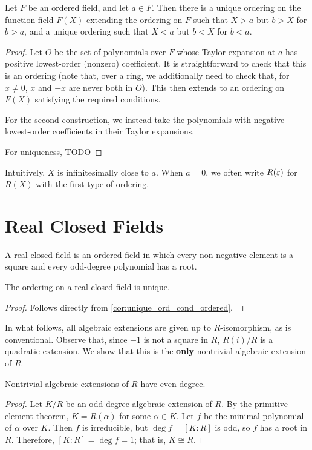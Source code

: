 \begin{lemma}
  \label{lem:order_fun_field}
  Let $F$ be an ordered field, and let $a\in F$. Then there is a unique ordering on the function field $F(X)$ extending the ordering on $F$ such that $X>a$ but $b>X$ for $b>a$, and a unique ordering such that $X<a$ but $b<X$ for $b<a$.
\end{lemma}
\begin{proof}
  Let $O$ be the set of polynomials over $F$ whose Taylor expansion at $a$ has positive lowest-order (nonzero) coefficient. It is straightforward to check that this is an ordering (note that, over a ring, we additionally need to check that, for $x\neq0$, $x$ and $-x$ are never both in $O$). This then extends to an ordering on $F(X)$ satisfying the required conditions.

  For the second construction, we instead take the polynomials with negative lowest-order coefficients in their Taylor expansions.

  For uniqueness, TODO
\end{proof}

Intuitively, $X$ is infinitesimally close to $a$. When $a=0$, we often write $R(\varepsilon)$ for $R(X)$ with the first type of ordering.

\section{Real Closed Fields}

\begin{definition}
  A real closed field is an ordered field in which every non-negative element is a square and every odd-degree polynomial has a root.
\end{definition}

\begin{lemma}
  \label{lem:RCF_ord_unique}
  The ordering on a real closed field is unique.
\end{lemma}
\begin{proof}
  Follows directly from \ref{cor:unique_ord_cond_ordered}.
\end{proof}

In what follows, all algebraic extensions are given up to $R$-isomorphism, as is conventional. Observe that, since $-1$ is not a square in $R$, $R(i)/R$ is a quadratic extension. We show that this is the \textbf{only} nontrivial algebraic extension of $R$.

\begin{lemma}
  \label{lem:alg_ext_odd_deg}
  Nontrivial algebraic extensions of $R$ have even degree.
\end{lemma}
\begin{proof}
  Let $K/R$ be an odd-degree algebraic extension of $R$. By the primitive element theorem, $K=R(\alpha)$ for some $\alpha\in K$. Let $f$ be the minimal polynomial of $\alpha$ over $K$. Then $f$ is irreducible, but $\deg f=[K:R]$ is odd, so $f$ has a root in $R$. Therefore, $[K:R]=\deg f=1$; that is, $K\cong R$.
\end{proof}

